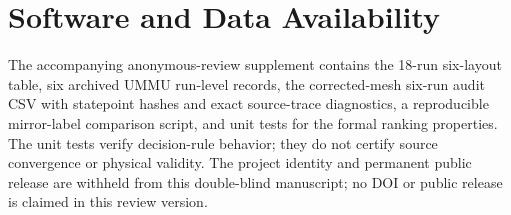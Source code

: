 \documentclass[conference]{IEEEtran}
\begin{document}
\section*{Software and Data Availability}
The accompanying anonymous-review supplement contains the 18-run six-layout table, six archived UMMU run-level records, the corrected-mesh six-run audit CSV with statepoint hashes and exact source-trace diagnostics, a reproducible mirror-label comparison script, and unit tests for the formal ranking properties. The unit tests verify decision-rule behavior; they do not certify source convergence or physical validity. The project identity and permanent public release are withheld from this double-blind manuscript; no DOI or public release is claimed in this review version.



\end{document}
